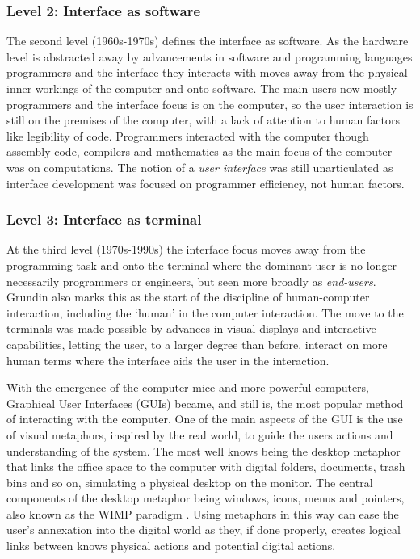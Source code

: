 \subsubsection{Level 2: Interface as software}
The second level (1960s-1970s) defines the interface as software.
As the hardware level is abstracted away by advancements in software and programming languages programmers and the interface they interacts with moves away from the physical inner workings of the computer and onto software.
The main users now mostly programmers and the interface focus is on the computer, so the user interaction is still on the premises of the computer, with a lack of attention to human factors like legibility of code.
Programmers interacted with the computer though assembly code, compilers and mathematics as the main focus of the computer was on computations. The notion of a \emph{user interface} was still unarticulated as interface development was focused on programmer efficiency, not human factors.

\subsubsection{Level 3: Interface as terminal}
At the third level (1970s-1990s) the interface focus moves away from the programming task and onto the terminal where the dominant user is no longer necessarily programmers or engineers, but seen more broadly as \emph{end-users}.
Grundin also marks this as the start of the discipline of human-computer interaction, including the `human' in the computer interaction.
The move to the terminals was made possible by advances in visual displays and interactive capabilities, letting the user, to a larger degree than before, interact on more human terms where the interface aids the user in the interaction.

With the emergence of the computer mice and more powerful computers, Graphical User Interfaces (GUIs) became, and still is, the most popular method of interacting with the computer.
One of the main aspects of the GUI is the use of visual metaphors, inspired by the real world, to guide the users actions and understanding of the system.
The most well knows being the desktop metaphor that links the office space to the computer with digital folders, documents, trash bins and so on, simulating a physical desktop on the monitor.
The central components of the desktop metaphor being windows, icons, menus and pointers, also known as the WIMP paradigm \citep[chap. 6]{krumm2009ubiquitous}. 
Using metaphors in this way can ease the user's annexation into the digital world as they, if done properly, creates logical links between knows physical actions and potential digital actions.

